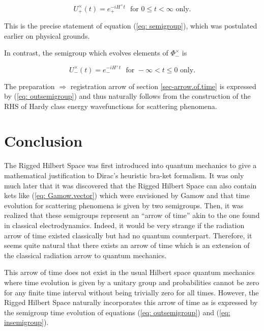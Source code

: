 \documentclass[12pt]{article}
\begin{document}
\begin{equation}
U_+^{\times}(t) = e_+^{-iH^{\times}t} \,\,\,\, \mbox{for} \,\, 0 \leq t < \infty \,\, \mbox{only}.   \label{eq: outsemigroup}
\end{equation}

\noindent This is the precise statement of equation (\ref{eq: semigroup}), which was postulated earlier on physical grounds.

In contrast, the semigroup which evolves elements of $\Phi_-^{\times}$ is

\begin{equation}
U_-^{\times}(t) = e_-^{-iH^{\times}t} \,\,\,\, \mbox{for} \,\, -\infty < t \leq 0 \,\, \mbox{only}.    \label{eq: insemigroup}
\end{equation}

The preparation $\Rightarrow$ registration arrow of section \ref{sec-arrow.of.time} is expressed by (\ref{eq: outsemigroup}) and thus naturally follows from the construction of the RHS of Hardy class energy wavefunctions for scattering phenomena.

\section{Conclusion}

The Rigged Hilbert Space was first introduced into quantum mechanics to give a mathematical justification to Dirac's heuristic bra-ket formalism.  It was only much later \cite{Bohm.QM.book} that it was discovered that the Rigged Hilbert Space can also contain kets like (\ref{eq: Gamow.vector}) which were envisioned by Gamow \cite{Gamow} and that time evolution for scattering phenomena is given by two semigroups.  Then, it was realized that these semigroups represent an ``arrow of time'' akin to the one found in classical electrodynamics.  Indeed, it would be very strange if the radiation arrow of time existed classically but had no quantum counterpart.  Therefore, it seems quite natural that there exists an arrow of time which is an extension of the classical radiation arrow to quantum mechanics.

This arrow of time does not exist in the usual Hilbert space quantum mechanics where time evolution is given by a unitary group and probabilities cannot be zero for any finite time interval without being trivially zero for all times.  However,  the Rigged Hilbert Space naturally incorporates this arrow of time as is expressed by the semigroup time evolution of equations (\ref{eq: outsemigroup}) and (\ref{eq: insemigroup}).
\end{document}
